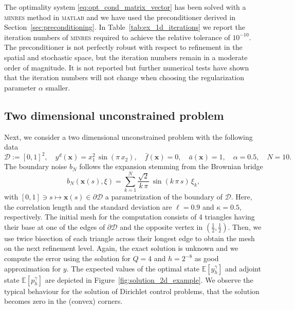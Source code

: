 \documentclass[a4paper,10pt]{article}
\newcommand{\bx}{{\boldsymbol{x}}}
\newcommand{\cD}{{\mathcal{D}}}
\newcommand{\E}{{\mathbb{E}}}
\numberwithin{theorem}{section}
\begin{document}
The optimality system \eqref{eq:opt_cond_matrix_vector} has been  solved with a \textsc{minres} method in \textsc{matlab} and we have used the preconditioner derived in Section~\ref{sec:preconditioning}. In Table~\ref{tab:ex_1d_iterations} we report the iteration numbers of \textsc{minres} required to achieve the relative tolerance of $10^{-10}$. The preconditioner is not perfectly robust with respect to refinement in the spatial and stochastic space, but the iteration numbers remain in a moderate order of magnitude. It is not reported  but further numerical tests have shown that the iteration numbers will not change when choosing the regularization parameter $\alpha$ smaller.

\subsection{Two dimensional unconstrained problem}
\label{sec:2d_example}

Next, we consider a two dimensional unconstrained problem with the following data 
\begin{equation*}
	\cD:=[0,1]^2,\quad y^d(\bx) = x_1^2\,\sin(\pi\,x_2),\quad \bar f(\bx) = 0,\quad \bar a(\bx) = 1,\quad \alpha = 0.5,\quad N=10.
\end{equation*}
The boundary noise $b_N$ follows the expansion stemming from the Brownian bridge
\begin{equation*}
	b_N(\bx(s),\xi) = \sum_{k=1}^N \frac{\sqrt2}{k\,\pi}\,\sin(k\,\pi\,s)\,\xi_k,
\end{equation*}
with $[0,1]\ni s\mapsto \bx(s)\in \partial\cD$ a parametrization of the boundary of $\cD$. Here, the correlation length and the standard deviation are  $\ell=0.9$ and $\kappa=0.5$, respectively. The initial mesh for the computation consists of 4 triangles having their base at one of the edges of $\partial\cD$ and the opposite vertex in $(\frac12,\frac12)$. Then, we use twice bisection of each triangle across their longest edge to obtain the mesh on the next refinement level. Again, the exact solution is unknown and we compute the error using the solution for $Q=4$ and $h=2^{-8}$ as good approximation for $y$. The expected values of the optimal state $\E[y_h^\gamma]$ and adjoint state $\E[p_h^\gamma]$ are depicted in Figure~\ref{fig:solution_2d_example}. We observe the typical behaviour for the solution of Dirichlet control problems, that the solution becomes zero in the (convex) corners.
\end{document}

